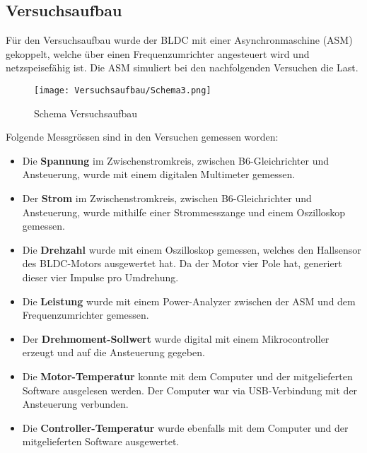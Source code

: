\subsection{Versuchsaufbau}\label{subsec:Versuchsaufbau}
Für den Versuchsaufbau wurde der BLDC mit einer Asynchronmaschine (ASM) gekoppelt, welche über einen Frequenzumrichter angesteuert wird und netzspeisefähig ist. Die ASM simuliert bei den nachfolgenden Versuchen die Last.


\begin{figure}[H]
	\begin{center}
		\texttt{[image: Versuchsaufbau/Schema3.png]}
		\caption{Schema Versuchsaufbau}
		\label{fig:Schema}
	\end{center}
\end{figure}

Folgende Messgrössen sind in den Versuchen gemessen worden:
\begin{itemize}
	\item Die \textbf{Spannung} im Zwischenstromkreis, zwischen B6-Gleichrichter und Ansteuerung, wurde mit einem digitalen Multimeter gemessen.
	\item Der \textbf{Strom} im Zwischenstromkreis, zwischen B6-Gleichrichter und Ansteuerung, wurde mithilfe einer Strommesszange und einem Oszilloskop gemessen.
	\item Die \textbf{Drehzahl} wurde mit einem Oszilloskop gemessen, welches den Hallsensor des BLDC-Motors ausgewertet hat. Da der Motor vier Pole hat, generiert dieser vier Impulse pro Umdrehung.
	\item Die \textbf{Leistung} wurde mit einem Power-Analyzer zwischen der ASM und dem Frequenzumrichter gemessen.
	\item Der \textbf{Drehmoment-Sollwert} wurde digital mit einem Mikrocontroller erzeugt und auf die Ansteuerung gegeben.
	\item Die \textbf{Motor-Temperatur} konnte mit dem Computer und der mitgelieferten Software ausgelesen werden. Der Computer war via USB-Verbindung mit der Ansteuerung verbunden.
	\item Die \textbf{Controller-Temperatur} wurde ebenfalls mit dem Computer und der mitgelieferten Software ausgewertet.
\end{itemize}

